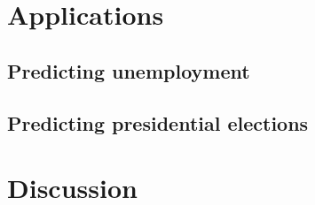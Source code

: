 \documentclass[12pt,fullpage,endnotes]{article}
\begin{document}
\section{Applications}
\subsection{Predicting unemployment}
\subsection{Predicting presidential elections}


\section{Discussion} 




\singlespacing


\end{document}
